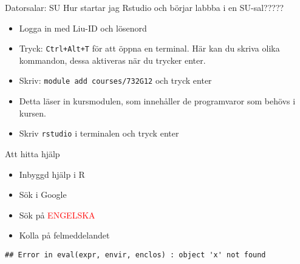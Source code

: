 \documentclass[
  10pt,
  ignorenonframetext,
]{beamer}
\providecommand{\tightlist}{%
  \setlength{\itemsep}{0pt}\setlength{\parskip}{0pt}}
\begin{document}
\begin{frame}{Datorsalar: SU}
Hur startar jag Rstudio och börjar labbba i en SU-sal?????
\begin{itemize}
\tightlist
\item
 Logga in med Liu-ID och lösenord
\item
  Tryck: \texttt{Ctrl+Alt+T} för att öppna en terminal. Här kan du skriva olika kommandon, dessa aktiveras när du trycker enter.
\item
  Skriv: \texttt{module add courses/732G12} och tryck enter
\item
  Detta läser in kursmodulen, som innehåller de programvaror som behövs i kursen.
\item
  Skriv \texttt{rstudio} i terminalen och tryck enter
\end{itemize}
\end{frame}




\begin{frame}[fragile]{Att hitta hjälp}
\protect\hypertarget{att-hitta-hjuxe4lp}{}
\begin{itemize}
\tightlist
\item
  Inbyggd hjälp i R
\item
  Sök i Google
\item
  Sök på \textcolor{red}{ENGELSKA}
\item
  Kolla på felmeddelandet
\end{itemize}

\begin{verbatim}
## Error in eval(expr, envir, enclos) : object 'x' not found
\end{verbatim}
\end{frame}

\end{document}
